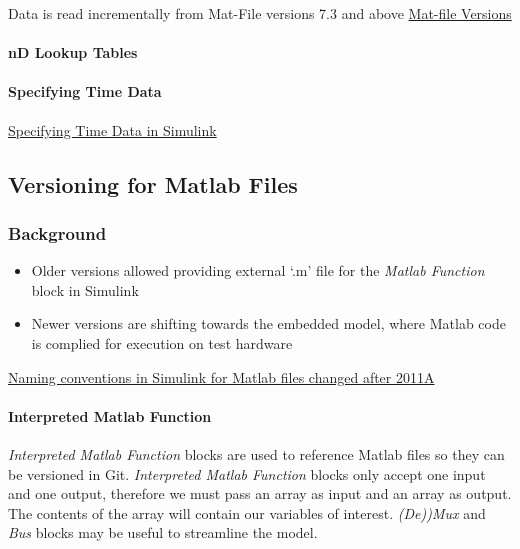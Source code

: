 \documentclass[]{article}
\providecommand{\tightlist}{%
  \setlength{\itemsep}{0pt}\setlength{\parskip}{0pt}}
\let\oldparagraph\paragraph
\renewcommand{\paragraph}[1]{\oldparagraph{#1}\mbox{}}
\begin{document}
Data is read incrementally from Mat-File versions 7.3 and above
\href{http://www.mathworks.com/help/matlab/import_export/mat-file-versions.html}{Mat-file
Versions}

\paragraph{nD Lookup Tables}\label{nd-lookup-tables}

\paragraph{Specifying Time Data}\label{specifying-time-data}

\href{http://www.mathworks.com/help/simulink/ug/importing-data-structures-to-a-root-level-input-port.html\#bsuwoyk}{Specifying
Time Data in Simulink}

\subsection{Versioning for Matlab
Files}\label{versioning-for-matlab-files}

\subsubsection{Background}\label{background}

\begin{itemize}
\tightlist
\item
  Older versions allowed providing external `.m' file for the
  \emph{Matlab Function} block in Simulink
\item
  Newer versions are shifting towards the embedded model, where Matlab
  code is complied for execution on test hardware
\end{itemize}

\href{http://www.goddardconsulting.ca/simulink-using-embedded-matlab.html}{Naming
conventions in Simulink for Matlab files changed after 2011A}

\paragraph{Interpreted Matlab
Function}\label{interpreted-matlab-function}

\emph{Interpreted Matlab Function} blocks are used to reference Matlab
files so they can be versioned in Git. \emph{Interpreted Matlab
Function} blocks only accept one input and one output, therefore we must
pass an array as input and an array as output. The contents of the array
will contain our variables of interest. \emph{(De))Mux} and \emph{Bus}
blocks may be useful to streamline the model.
\end{document}
